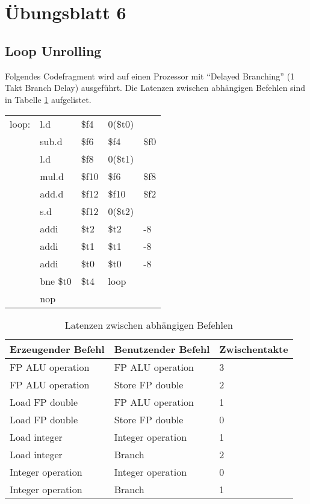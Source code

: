 \pagebreak
\section{Übungsblatt 6}
\setcounter{subsection}{4}
\subsection{Loop Unrolling}
Folgendes Codefragment wird auf einen Prozessor mit "`Delayed Branching"' (1 Takt Branch Delay) ausgeführt. Die Latenzen zwischen abhängigen Befehlen sind in Tabelle \ref{tbl:stalls1} aufgelistet.

{
	\ttfamily
	\begin{tabular}{l llll}
		loop: & l.d      & \$f4  & 0(\$t0) &      \\
		      & sub.d    & \$f6  & \$f4    & \$f0 \\
		      & l.d      & \$f8  & 0(\$t1) &      \\
		      & mul.d    & \$f10 & \$f6    & \$f8 \\
		      & add.d    & \$f12 & \$f10   & \$f2 \\
		      & s.d      & \$f12 & 0(\$t2) &      \\
		      & addi     & \$t2  & \$t2    & -8   \\
		      & addi     & \$t1  & \$t1    & -8   \\
		      & addi     & \$t0  & \$t0    & -8   \\
		      & bne \$t0 & \$t4  & loop    &      \\
		      & nop      &       &         &
	\end{tabular}
}

\begin{table}[h!]
	\centering
	\begin{tabular}{lll}
		\hline
		Erzeugender Befehl & Benutzender Befehl & Zwischentakte \\ \hline
		FP ALU operation   & FP ALU operation   & 3             \\
		FP ALU operation   & Store FP double    & 2             \\
		Load FP double     & FP ALU operation   & 1             \\
		Load FP double     & Store FP double    & 0             \\
		Load integer       & Integer operation  & 1             \\
		Load integer       & Branch             & 2             \\
		Integer operation  & Integer operation  & 0             \\
		Integer operation  & Branch             & 1             \\ \hline
	\end{tabular}
	\caption{Latenzen zwischen abhängigen Befehlen}
	\label{tbl:stalls1}
\end{table}

